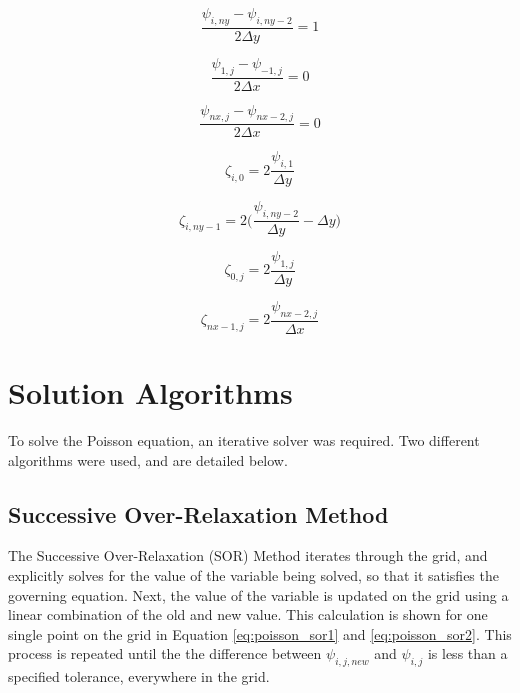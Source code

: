 \begin{equation}
\label{eq:v_top_disc} 
\frac{\psi_{ i,ny} - \psi_{ i,ny-2}}{2\Delta y} = 1
\end{equation}



\begin{equation}
\label{eq:v_left_disc} 
\frac{\psi_{1,j} - \psi_{-1,j}}{2\Delta x} = 0
\end{equation}

\begin{equation}
\label{eq:v_right_disc} 
\frac{\psi_{nx,j} - \psi_{nx-2,j}}{2\Delta x} = 0
\end{equation}




\begin{equation}
\label{eq:bc_zeta_bot} 
\zeta_{i,0} = 2\frac{\psi_{i,1}}{\Delta y}
\end{equation}

\begin{equation}
\label{eq:bc_zeta_top} 
\zeta_{i,ny-1} = 2\Big( \frac{\psi_{i,ny-2}}{\Delta y}  - \Delta y \Big)
\end{equation}



\begin{equation}
\label{eq:bc_zeta_left} 
\zeta_{0,j} = 2\frac{\psi_{1,j}}{\Delta y}
\end{equation}

\begin{equation}
\label{eq:bc_zeta_right} 
\zeta_{nx-1,j} = 2\frac{\psi_{nx-2,j}}{\Delta x}
\end{equation}



\section{Solution Algorithms}
\label{sec:sol_algo}

To solve the Poisson equation, an iterative solver was required.  Two different algorithms were used, and are detailed below.

	\subsection{Successive Over-Relaxation Method}
The Successive Over-Relaxation (SOR) Method iterates through the grid, and explicitly solves for the value of the variable being solved, so that it satisfies the governing equation.  Next, the value of the variable is updated on the grid using a linear combination of the old and new value.  This calculation is shown for one single point on the grid in Equation \ref{eq:poisson_sor1} and \ref{eq:poisson_sor2}.  This process is repeated until the the difference between $\psi_{i,j,new}$ and $\psi_{i,j}$ is less than a specified tolerance, everywhere in the grid.


